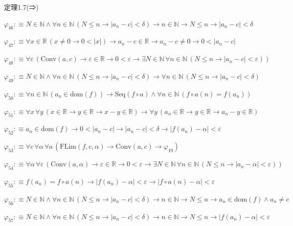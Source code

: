 \begin{fullproof}{定理1.7(⇒)}
\begin{abbrevlist}
\item $\varphi_{46} :\equiv N \in \mathbb{N} \land \forall n \in \mathbb{N}\,(N \leq n \to \lvert a_{n} - c \rvert < \delta) \to n \in \mathbb{N} \to N \leq n \to \lvert a_{n} - c \rvert < \delta$
\item $\varphi_{47} :\equiv \forall x \in \mathbb{R}\,(x \neq 0 \to 0 < \lvert x \rvert) \to a_{n} - c \in \mathbb{R} \to a_{n} - c \neq 0 \to 0 < \lvert a_{n} - c \rvert$
\item $\varphi_{48} :\equiv \forall \varepsilon\,(\mathrm{Conv}(a,c) \to \varepsilon \in \mathbb{R} \to 0 < \varepsilon \to \exists N \in \mathbb{N}\,\forall n \in \mathbb{N}\,(N \leq n \to \lvert a_{n} - c \rvert < \varepsilon))$
\item $\varphi_{49} :\equiv N \in \mathbb{N} \land \forall n \in \mathbb{N}\,(N \leq n \to \lvert a_{n} - c \rvert < \delta) \to \forall n \in \mathbb{N}\,(N \leq n \to \lvert a_{n} - c \rvert < \delta)$
\item $\varphi_{50} :\equiv \forall n \in \mathbb{N}\,(a_{n} \in \mathrm{dom}(f)) \to \mathrm{Seq}(f \circ a) \land \forall n \in \mathbb{N}\,(f \circ a(n) = f(a_{n}))$
\item $\varphi_{51} :\equiv \forall x\,\forall y\,(x \in \mathbb{R} \to y \in \mathbb{R} \to x - y \in \mathbb{R}) \to \forall y\,(a_{n} \in \mathbb{R} \to y \in \mathbb{R} \to a_{n} - y \in \mathbb{R})$
\item $\varphi_{52} :\equiv a_{n} \in \mathrm{dom}(f) \to 0 < \lvert a_{n} - c \rvert \to \lvert a_{n} - c \rvert < \delta \to \lvert f(a_{n}) - \alpha \rvert < \varepsilon$
\item $\varphi_{53} :\equiv \forall c\,\forall \alpha\,\forall a\,(\mathrm{FLim}(f,c,\alpha) \to \mathrm{Conv}(a,c) \to \varphi_{19})$
\item $\varphi_{54} :\equiv \forall \alpha\,\forall \varepsilon\,(\mathrm{Conv}(a,\alpha) \to \varepsilon \in \mathbb{R} \to 0 < \varepsilon \to \exists N \in \mathbb{N}\,\forall n \in \mathbb{N}\,(N \leq n \to \lvert a_{n} - \alpha \rvert < \varepsilon))$
\item $\varphi_{55} :\equiv f(a_{n}) = f \circ a(n) \to \lvert f(a_{n}) - \alpha \rvert < \varepsilon \to \lvert f \circ a(n) - \alpha \rvert < \varepsilon$
\item $\varphi_{56} :\equiv N \in \mathbb{N} \land \forall n \in \mathbb{N}\,(N \leq n \to \lvert a_{n} - c \rvert < \delta) \to n \in \mathbb{N} \to N \leq n \to a_{n} \in \mathrm{dom}(f) \land a_{n} \neq c$
\item $\varphi_{57} :\equiv N \in \mathbb{N} \land \forall n \in \mathbb{N}\,(N \leq n \to \lvert a_{n} - c \rvert < \delta) \to n \in \mathbb{N} \to N \leq n \to \lvert f(a_{n}) - \alpha \rvert < \varepsilon$

\end{abbrevlist}
\end{fullproof}
